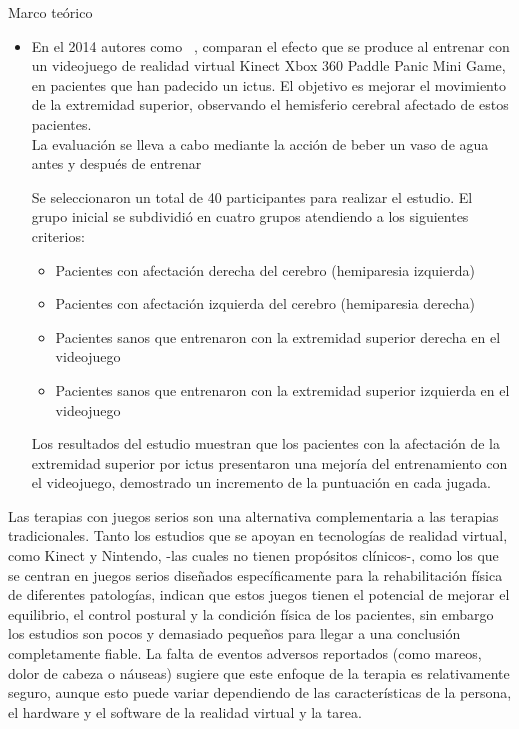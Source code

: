 \begin{thesischapter}{1} {Marco teórico}
\begin{itemize}
        \vspace{2pt}
        Un grupo de 35 pacientes se formó para la rehabilitación de las extremidades superiores
        en combinación con el soporte de brazo y el ejercicio, mientras que 33 pacientes realizaron
        la rehabilitación con los ejercicios convencionales.
        
        \item En el 2014  autores como ~\cite{10.3233/NRE-141105}, comparan el efecto
        que se produce al entrenar con un videojuego de realidad virtual Kinect Xbox 360 Paddle
        Panic Mini Game, en pacientes que han padecido un ictus. El objetivo es mejorar el
        movimiento de la extremidad superior, observando el hemisferio cerebral afectado de
        estos pacientes.\\
        La evaluación se lleva a cabo mediante la acción de beber un vaso de agua antes y después
        de entrenar

        \vspace{5pt}
        Se seleccionaron un total de 40 participantes para realizar el estudio. El grupo inicial se
        subdividió en cuatro grupos atendiendo a los siguientes criterios:
        \begin{itemize}
            \item Pacientes con afectación derecha del cerebro (hemiparesia izquierda)
            \item Pacientes con afectación izquierda del cerebro (hemiparesia derecha)
            \item Pacientes sanos que entrenaron con la extremidad superior derecha en el videojuego
            \item Pacientes sanos que entrenaron con la extremidad superior izquierda en el videojuego
        \end{itemize}
        Los resultados del estudio muestran que los pacientes con la afectación de la extremidad
        superior por ictus presentaron una mejoría del entrenamiento con el videojuego,
        demostrado un incremento de la puntuación en cada jugada.
    \end{itemize}

    \vspace{5pt}
    Las terapias con juegos serios son una alternativa complementaria a las terapias
    tradicionales. Tanto los estudios que se apoyan en tecnologías de realidad virtual, como Kinect y
    Nintendo, -las cuales no tienen propósitos clínicos-, como los que se centran en juegos
    serios diseñados específicamente para la rehabilitación física de diferentes patologías,
    indican que estos juegos tienen el potencial de mejorar el equilibrio, el control postural y
    la condición física de los pacientes, sin embargo los estudios son pocos y demasiado
    pequeños para llegar a una conclusión completamente fiable. La falta de eventos adversos
    reportados (como mareos, dolor de cabeza o náuseas) sugiere que este enfoque de la
    terapia es relativamente seguro, aunque esto puede variar dependiendo de las
    características de la persona, el hardware y el software de la realidad virtual y la tarea. 


\end{thesischapter}
